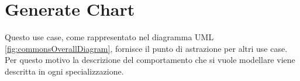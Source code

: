 \section{Generate Chart}
\label{seq:generateChart}
Questo use case, come rappresentato nel diagramma UML
\autoref{fig:commonsOverallDiagram}, fornisce il punto di astrazione per altri
use case. Per questo motivo la descrizione del comportamento che  si
vuole modellare viene descritta in ogni specializzazione.